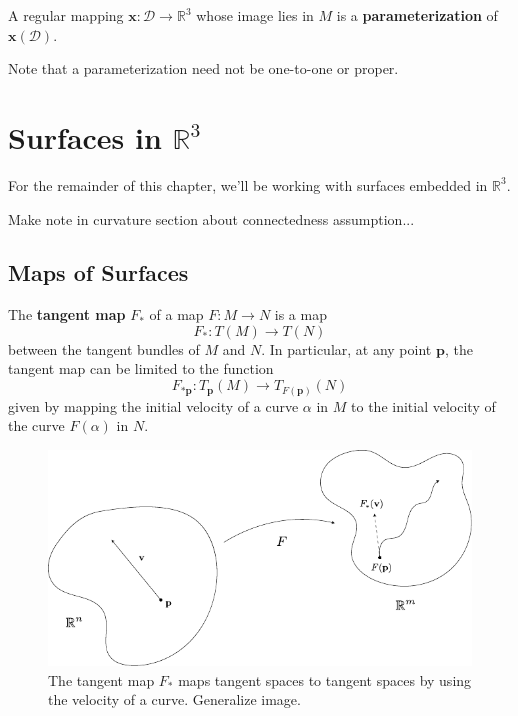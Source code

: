 \documentclass[10pt]{report}
\begin{document}
\begin{defn}[]
	A regular mapping $\mathbf{x}:\mathcal{D}\to \mathbb{R}^3$ whose image lies in $M$ is a \textbf{parameterization} of $\mathbf{x}(\mathcal{D})$.
\end{defn}

Note that a parameterization need not be one-to-one or proper.


\chapter{Surfaces in \texorpdfstring{$\mathbb{R}^3$}{R3}}

\begin{note}[]
For the remainder of this chapter, we'll be working with surfaces embedded in $\mathbb{R}^3$.
\end{note}

{\color{red}Make note in curvature section about connectedness assumption...}


\section{Maps of Surfaces}

\begin{defn}
The \textbf{tangent map} $F_*$ of a map $F:M\to N$ is a map
\[
	F_* : T(M) \to T(N)
\] between the tangent bundles of $M$ and $N$. In particular, at any point $\mathbf{p}$, the tangent map can be limited to the function
\[
	F_{*\mathbf{p}}:T_{\mathbf{p}}(M)\to T_{F(\mathbf{p})}(N)
\]
given by mapping the initial velocity of a curve $\alpha$ in $M$ to the initial velocity of the curve $F(\alpha)$ in $N$.
\end{defn}

\begin{figure}[H]
	\centering
	\includegraphics[scale=1]{fig/tan-map.pdf}
	\caption{The tangent map $F_*$ maps tangent spaces to tangent spaces by using the velocity of a curve. {\color{red}Generalize image.}}
\end{figure}
\end{document}

